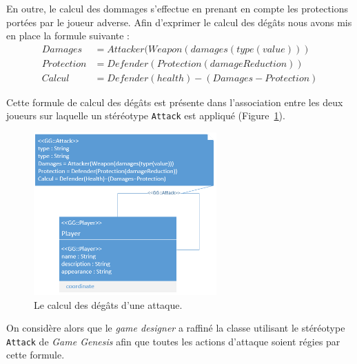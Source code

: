 \begin{samepage}
En outre, le calcul des dommages s'effectue en prenant en compte les protections portées par le joueur adverse.
Afin d'exprimer le calcul des dégâts nous avons mis en place la formule suivante :
%
\begin{equation*}
\begin{split}
Damages& = Attacker(Weapon(damages(type(value)))\\
Protection& = Defender(Protection(damageReduction))\\
Calcul& = Defender(health) - (Damages - Protection)
\end{split}
\end{equation*}

\end{samepage}



Cette formule de calcul des dégâts est présente dans l'association entre les deux joueurs sur laquelle un stéréotype \texttt{Attack} est appliqué (Figure~\ref{fig.PUBG_attack_degats}).

\begin{figure}
    \centering
    \includegraphics[width=7cm]{10_img/chap6/p_attack_p.PNG}
    \caption{Le calcul des dégâts d'une attaque.}
    \label{fig.PUBG_attack_degats}
\end{figure}

On considère alors que le \emph{game designer} a raffin\'e la classe utilisant le stéréotype \texttt{Attack} de \emph{Game Genesis} afin que toutes les actions d'attaque soient régies par cette formule.



